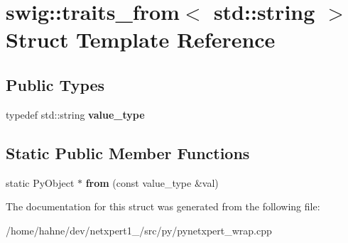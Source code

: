 \hypertarget{structswig_1_1traits__from_3_01std_1_1string_01_4}{}\section{swig\+:\+:traits\+\_\+from$<$ std\+:\+:string $>$ Struct Template Reference}
\label{structswig_1_1traits__from_3_01std_1_1string_01_4}
\subsection*{Public Types}
\begin{DoxyCompactItemize}
\item 
typedef std\+::string {\bfseries value\+\_\+type}\hypertarget{structswig_1_1traits__from_3_01std_1_1string_01_4_a873f8111e50ab64c5f0711f3fc8479ad}{}\label{structswig_1_1traits__from_3_01std_1_1string_01_4_a873f8111e50ab64c5f0711f3fc8479ad}

\end{DoxyCompactItemize}
\subsection*{Static Public Member Functions}
\begin{DoxyCompactItemize}
\item 
static Py\+Object $\ast$ {\bfseries from} (const value\+\_\+type \&val)\hypertarget{structswig_1_1traits__from_3_01std_1_1string_01_4_af6e0987239b6f657facf1fc5fcbddea6}{}\label{structswig_1_1traits__from_3_01std_1_1string_01_4_af6e0987239b6f657facf1fc5fcbddea6}

\end{DoxyCompactItemize}


The documentation for this struct was generated from the following file\+:\begin{DoxyCompactItemize}
\item 
/home/hahne/dev/netxpert1\+\_/src/py/pynetxpert\+\_\+wrap.\+cpp\end{DoxyCompactItemize}
